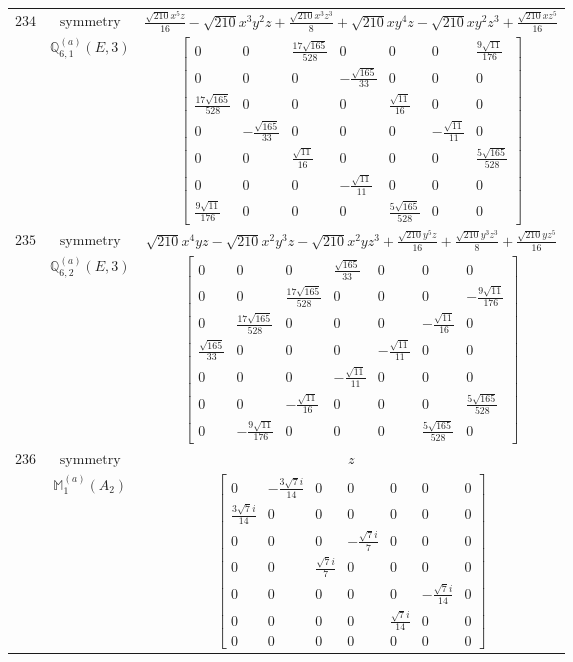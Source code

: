 \documentclass[fleqn,8pt,landscape]{jsarticle}
\begin{document}
\begin{longtable}{ccc}
$ 234 $ & $ \text{symmetry} $ & $ \frac{\sqrt{210} x^{5} z}{16} - \sqrt{210} x^{3} y^{2} z + \frac{\sqrt{210} x^{3} z^{3}}{8} + \sqrt{210} x y^{4} z - \sqrt{210} x y^{2} z^{3} + \frac{\sqrt{210} x z^{5}}{16} $ \\
$  $ & $ \mathbb{Q}_{6,1}^{(a)}(E,3) $ & $ \begin{bmatrix} 0 & 0 & \frac{17 \sqrt{165}}{528} & 0 & 0 & 0 & \frac{9 \sqrt{11}}{176} \\ 0 & 0 & 0 & - \frac{\sqrt{165}}{33} & 0 & 0 & 0 \\ \frac{17 \sqrt{165}}{528} & 0 & 0 & 0 & \frac{\sqrt{11}}{16} & 0 & 0 \\ 0 & - \frac{\sqrt{165}}{33} & 0 & 0 & 0 & - \frac{\sqrt{11}}{11} & 0 \\ 0 & 0 & \frac{\sqrt{11}}{16} & 0 & 0 & 0 & \frac{5 \sqrt{165}}{528} \\ 0 & 0 & 0 & - \frac{\sqrt{11}}{11} & 0 & 0 & 0 \\ \frac{9 \sqrt{11}}{176} & 0 & 0 & 0 & \frac{5 \sqrt{165}}{528} & 0 & 0 \end{bmatrix} $ \\ \hline
$ 235 $ & $ \text{symmetry} $ & $ \sqrt{210} x^{4} y z - \sqrt{210} x^{2} y^{3} z - \sqrt{210} x^{2} y z^{3} + \frac{\sqrt{210} y^{5} z}{16} + \frac{\sqrt{210} y^{3} z^{3}}{8} + \frac{\sqrt{210} y z^{5}}{16} $ \\
$  $ & $ \mathbb{Q}_{6,2}^{(a)}(E,3) $ & $ \begin{bmatrix} 0 & 0 & 0 & \frac{\sqrt{165}}{33} & 0 & 0 & 0 \\ 0 & 0 & \frac{17 \sqrt{165}}{528} & 0 & 0 & 0 & - \frac{9 \sqrt{11}}{176} \\ 0 & \frac{17 \sqrt{165}}{528} & 0 & 0 & 0 & - \frac{\sqrt{11}}{16} & 0 \\ \frac{\sqrt{165}}{33} & 0 & 0 & 0 & - \frac{\sqrt{11}}{11} & 0 & 0 \\ 0 & 0 & 0 & - \frac{\sqrt{11}}{11} & 0 & 0 & 0 \\ 0 & 0 & - \frac{\sqrt{11}}{16} & 0 & 0 & 0 & \frac{5 \sqrt{165}}{528} \\ 0 & - \frac{9 \sqrt{11}}{176} & 0 & 0 & 0 & \frac{5 \sqrt{165}}{528} & 0 \end{bmatrix} $ \\ \hline
$ 236 $ & $ \text{symmetry} $ & $ z $ \\
$  $ & $ \mathbb{M}_{1}^{(a)}(A_{2}) $ & $ \begin{bmatrix} 0 & - \frac{3 \sqrt{7} i}{14} & 0 & 0 & 0 & 0 & 0 \\ \frac{3 \sqrt{7} i}{14} & 0 & 0 & 0 & 0 & 0 & 0 \\ 0 & 0 & 0 & - \frac{\sqrt{7} i}{7} & 0 & 0 & 0 \\ 0 & 0 & \frac{\sqrt{7} i}{7} & 0 & 0 & 0 & 0 \\ 0 & 0 & 0 & 0 & 0 & - \frac{\sqrt{7} i}{14} & 0 \\ 0 & 0 & 0 & 0 & \frac{\sqrt{7} i}{14} & 0 & 0 \\ 0 & 0 & 0 & 0 & 0 & 0 & 0 \end{bmatrix} $ \\ \hline

\end{longtable}
\end{document}
